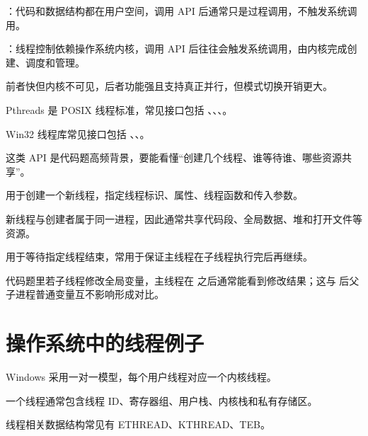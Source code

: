 \begin{points}
  \item {}：代码和数据结构都在用户空间，调用 API 后通常只是过程调用，不触发系统调用。
  \item {}：线程控制依赖操作系统内核，调用 API 后往往会触发系统调用，由内核完成创建、调度和管理。
  \item 前者快但内核不可见，后者功能强且支持真正并行，但模式切换开销更大。
\end{points}


\begin{points}
  \item Pthreads 是 POSIX 线程标准，常见接口包括 、、、。
  \item Win32 线程库常见接口包括 、、。
  \item 这类 API 是代码题高频背景，要能看懂“创建几个线程、谁等待谁、哪些资源共享”。
\end{points}


\begin{points}
  \item {} 用于创建一个新线程，指定线程标识、属性、线程函数和传入参数。
  \item 新线程与创建者属于同一进程，因此通常共享代码段、全局数据、堆和打开文件等资源。
  \item {} 用于等待指定线程结束，常用于保证主线程在子线程执行完后再继续。
  \item 代码题里若子线程修改全局变量，主线程在  之后通常能看到修改结果；这与  后父子进程普通变量互不影响形成对比。
\end{points}


\section{操作系统中的线程例子}
\begin{points}
  \item Windows 采用一对一模型，每个用户线程对应一个内核线程。
  \item 一个线程通常包含线程 ID、寄存器组、用户栈、内核栈和私有存储区。
  \item 线程相关数据结构常见有 ETHREAD、KTHREAD、TEB。
\end{points}


